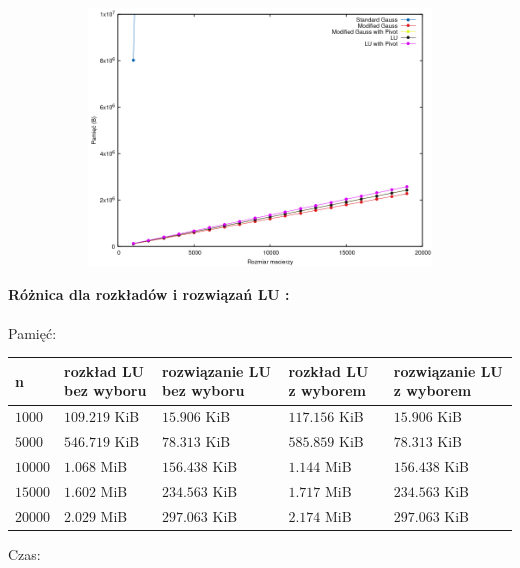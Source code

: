 \documentclass{article}
\begin{document}
\begin{figure}[ht]
	\centering
	\begin{subfigure}{0.8\textwidth}
		\centering
		\includegraphics[width=1.0\linewidth]{../plots/plotting_Memory.png}  
	\end{subfigure}
\end{figure} 
\newpage
\noindent \textbf{Różnica dla rozkładów i rozwiązań LU :}\\\\
Pamięć:
\begin{center}
	\begin{tabular}{|p{1cm}|p{3cm}|p{3cm}|p{3cm}|p{3cm}|}
		\hline
		\textbf{n} & \textbf{rozkład LU  bez wyboru} & \textbf{rozwiązanie LU bez wyboru} & \textbf{rozkład LU  z wyborem} & \textbf{rozwiązanie LU z wyborem}  \\
		\hline
		$1000$  & $109.219$ KiB & $15.906$ KiB & $117.156$ KiB & $15.906$ KiB \\
		\hline
		$5000$ & $546.719$ KiB & $78.313$ KiB & $585.859$ KiB & $78.313$ KiB \\
		\hline
		$10000$ & $1.068$ MiB & $156.438$ KiB & $1.144$ MiB & $156.438$ KiB  \\
		\hline
		$15000$ & $1.602$ MiB & $234.563$ KiB & $1.717$ MiB & $234.563$ KiB  \\
		\hline
		$20000$ & $2.029$ MiB & $297.063$ KiB & $2.174$ MiB & $297.063$ KiB \\
		\hline
	\end{tabular}
\end{center}
Czas:
\end{document}
